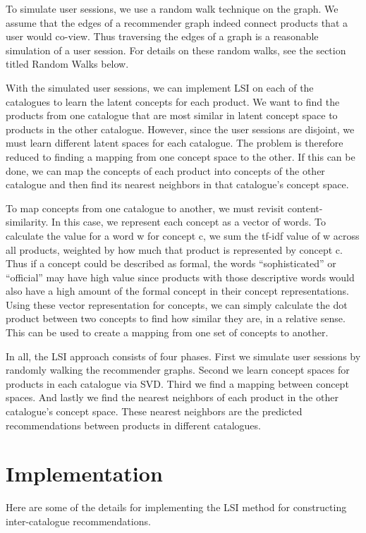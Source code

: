 \documentclass[11pt]{article}
\begin{document}
To simulate user sessions, we use a random walk technique on the graph. We
assume that the edges of a recommender graph indeed connect products that a user
would co-view. Thus traversing the edges of a graph is a reasonable simulation
of a user session. For details on these random walks, see the section titled
Random Walks below.

With the simulated user sessions, we can implement LSI on each of the catalogues
to learn the latent concepts for each product. We want to find the products from
one catalogue that are most similar in latent concept space to products in the
other catalogue. However, since the user sessions are disjoint, we must learn
different latent spaces for each catalogue. The problem is therefore reduced to
finding a mapping from one concept space to the other. If this can be done, we
can map the concepts of each product into concepts of the other catalogue and
then find its nearest neighbors in that catalogue's concept space. 

To map concepts from one catalogue to another, we must revisit
content-similarity. In this case, we represent each concept as a vector of
words. To calculate the value for a word w for concept c, we sum the tf-idf
value of w across all products, weighted by how much that product is represented
by concept c. Thus if a concept could be described as formal, the words
``sophisticated'' or ``official'' may have high value since products with those
descriptive words would also have a high amount of the formal concept in their
concept representations. Using these vector representation for concepts, we can
simply calculate the dot product between two concepts to find how similar they
are, in a relative sense. This can be used to create a mapping from one set of
concepts to another.

In all, the LSI approach consists of four phases. First we simulate user
sessions by randomly walking the recommender graphs. Second we learn concept
spaces for products in each catalogue via SVD. Third we find a mapping between
concept spaces. And lastly we find the nearest neighbors of each product in the
other catalogue's concept space. These nearest neighbors are the predicted
recommendations between products in different catalogues.

\section*{Implementation}
Here are some of the details for implementing the LSI method for constructing
inter-catalogue recommendations.
\end{document}
